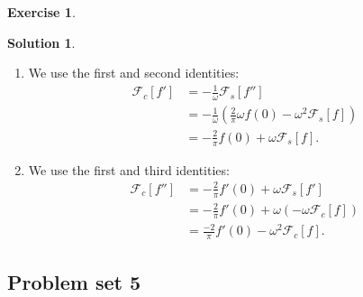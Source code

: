 \documentclass{article}
\theoremstyle{definition}
\newtheorem*{exer*}{Exercise}
\newtheorem*{sln*}{Solution}
\newcommand{\F}{\mathcal{F}}
\begin{document}
\begin{exer*}
\begin{sln*}
\begin{enumerate}
		
		
		
		\item We use the first and second identities:
		\begin{align*}
		\F_c[f'] &= -\frac{1}{\omega}\F_s[f'']\\
		&= -\frac{1}{\omega}\left( \frac{2}{\pi}\omega f(0) - \omega^2 \F_s[f]  \right)\\
		&= -\frac{2}{\pi} f(0) + \omega \F_s[f].
		\end{align*}
		
		\item We use the first and third identities:
		\begin{align*}
		\F_c[f''] &= -\frac{2}{\pi} f'(0) + \omega \F_s[f']\\
		&= -\frac{2}{\pi} f'(0) + \omega\left(-\omega \F_c[f]\right)\\
		&=  \frac{-2}{\pi} f'(0) - \omega^2 \F_c[f].
		\end{align*}
		
		
	\end{enumerate}
	
\end{sln*}

\end{exer*}



\newpage
\subsection{Problem set 5}
\end{document}
